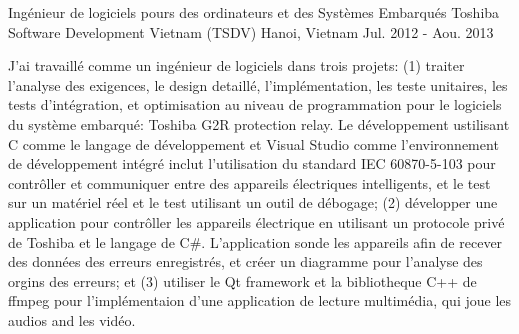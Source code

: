 \begin{cventries}
\cventry
{Ingénieur de logiciels pours des ordinateurs et des Systèmes Embarqués} %
{Toshiba Software Development Vietnam (TSDV)} %
{Hanoi, Vietnam} %
{Jul. 2012 - Aou. 2013} %
{ %
	\begin{cvitems}
		\item {J'ai travaillé comme un ingénieur de logiciels dans trois projets: (1) traiter l'analyse des exigences, le design detaillé, l'implémentation, les teste unitaires, les tests d'intégration, et optimisation au niveau de programmation pour le logiciels du système embarqué: Toshiba G2R protection relay. Le développement ustilisant C comme le langage de développement et Visual Studio comme l'environnement de développement intégré inclut l'utilisation du standard IEC 60870-5-103 pour contrôller et communiquer entre des appareils électriques intelligents, et le test sur un matériel réel et le test utilisant un outil de débogage; (2) développer une application pour contrôller les appareils électrique en utilisant un protocole privé de Toshiba et le langage de C\#. L'application sonde les appareils afin de recever des données des erreurs enregistrés, et créer un diagramme pour l'analyse des orgins des erreurs; et (3) utiliser le Qt framework et la bibliotheque C++ de ffmpeg pour l'implémentaion d'une application de lecture multimédia, qui joue les audios and les vidéo.}		
	\end{cvitems}
}

%


\end{cventries}